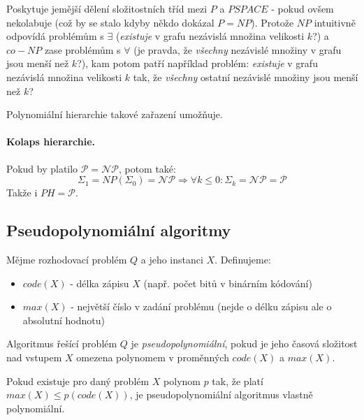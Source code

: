 \documentclass[a4paper]{article}      %
\newenvironment{definition}[1][Definice]{\begin{trivlist}
\item[\hskip \labelsep {\bfseries #1}]}{\end{trivlist}}
\newenvironment{remark}[1][Pozorování]{\begin{trivlist}
\item[\hskip \labelsep {\bfseries #1}]}{\end{trivlist}}
\begin{document}
\begin{remark}[K čemu je dobrá polynomiální hierarchie?]
Poskytuje jemější dělení složitostních tříd mezi $P$ a $PSPACE$ - pokud ovšem nekolabuje (což by se stalo kdyby někdo dokázal $P=NP$).
Protože $NP$ intuitivně odpovídá problémům s $\exists$ (\emph{existuje} v grafu nezávislá množina velikosti $k$?) a
$co-NP$ zase problémům s $\forall$ (je pravda, že \emph{všechny} nezávislé množiny v grafu jsou menší než $k$?), kam potom patří například problém: \emph{existuje} v grafu nezávislá množina velikosti $k$ tak, že \emph{všechny} ostatní nezávislé množiny jsou menší než $k$?

Polynomiální hierarchie takové zařazení umožňuje. 
\end{remark}

\paragraph{Kolaps hierarchie.} Pokud by platilo $\mathcal{P} = \mathcal{NP}$, potom také:
\[
\Sigma_{1} = NP(\Sigma_{0}) = \mathcal{NP} \Rightarrow \forall k\leq 0: \Sigma_{k} = \mathcal{NP} = \mathcal{P} 
\]
Takže i $PH = \mathcal{P}$.

\subsection{Pseudopolynomiální algoritmy}

\begin{definition}
Mějme rozhodovací problém $Q$ a jeho instanci $X$. Definujeme:
\begin{itemize}
\item $code(X)$ - délka zápisu $X$ (např. počet bitů v binárním kódování)
\item $max(X)$ - největší číslo v zadání problému (nejde o délku zápisu ale o absolutní hodnotu)
\end{itemize}
\end{definition}

\begin{definition}[Pseudopolynomiální algoritmus]
Algoritmus řešící problém $Q$ je \emph{pseudopolynomiální}, pokud
je jeho časová složitost nad vstupem $X$ omezena polynomem v proměnných $code(X)$ a $max(X)$.
\end{definition}

\begin{remark}
Pokud existuje pro daný problém $X$ polynom $p$ tak, že platí $max(X) \leq p(code(X))$, je pseudopolynomiální algoritmus vlastně polynomiální.
\end{remark}
\end{document}
